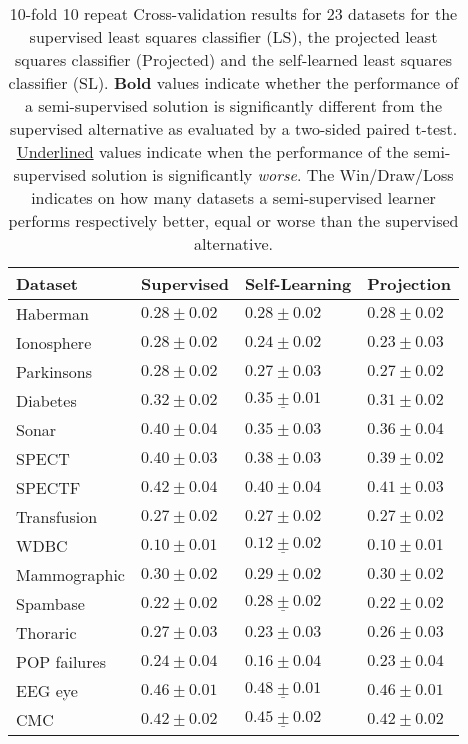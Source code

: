 \documentclass{article}
\begin{document}
\begin{table*}[t]
\center
\caption{10-fold 10 repeat Cross-validation results for 23 datasets for the supervised least squares classifier (LS), the projected least squares classifier (Projected) and the self-learned least squares classifier (SL). \textbf{Bold} values indicate whether the performance of a semi-supervised solution is significantly different from the supervised alternative as evaluated by a two-sided paired t-test. \underline{Underlined} values indicate when the performance of the semi-supervised solution is significantly \emph{worse}. The Win/Draw/Loss indicates on how many datasets a semi-supervised learner performs respectively better, equal or worse than the supervised alternative.}
\smallskip
\smallskip
\smallskip
\begin{tabular}{|l|lll|}
\hline
Dataset & Supervised & Self-Learning & Projection \\ 
\hline
Haberman & $0.28 \pm 0.02$& $0.28 \pm 0.02$& $0.28 \pm 0.02$\\ 
Ionosphere & $0.28 \pm 0.02$& $\mathbf{0.24 \pm 0.02} $& $\mathbf{0.23 \pm 0.03} $\\ 
Parkinsons & $0.28 \pm 0.02$& $0.27 \pm 0.03$& $0.27 \pm 0.02$\\ 
Diabetes & $0.32 \pm 0.02$& $\mathbf{\underline{0.35 \pm 0.01}} $& $0.31 \pm 0.02$\\ 
Sonar & $0.40 \pm 0.04$& $\mathbf{0.35 \pm 0.03} $& $\mathbf{0.36 \pm 0.04} $\\ 
SPECT & $0.40 \pm 0.03$& $0.38 \pm 0.03$& $0.39 \pm 0.02$\\ 
SPECTF & $0.42 \pm 0.04$& $0.40 \pm 0.04$& $0.41 \pm 0.03$\\ 
Transfusion & $0.27 \pm 0.02$& $0.27 \pm 0.02$& $0.27 \pm 0.02$\\ 
WDBC & $0.10 \pm 0.01$& $\mathbf{\underline{0.12 \pm 0.02}} $& $0.10 \pm 0.01$\\ 
Mammographic & $0.30 \pm 0.02$& $0.29 \pm 0.02$& $0.30 \pm 0.02$\\ 
Spambase & $0.22 \pm 0.02$& $\mathbf{\underline{0.28 \pm 0.02}} $& $0.22 \pm 0.02$\\ 
Thoraric & $0.27 \pm 0.03$& $\mathbf{0.23 \pm 0.03} $& $0.26 \pm 0.03$\\ 
POP failures & $0.24 \pm 0.04$& $\mathbf{0.16 \pm 0.04} $& $0.23 \pm 0.04$\\ 
EEG eye & $0.46 \pm 0.01$& $\mathbf{\underline{0.48 \pm 0.01}} $& $0.46 \pm 0.01$\\ 
CMC & $0.42 \pm 0.02$& $\mathbf{\underline{0.45 \pm 0.02}} $& $0.42 \pm 0.02$\\ 

\end{tabular}
\end{table*}
\end{document}
